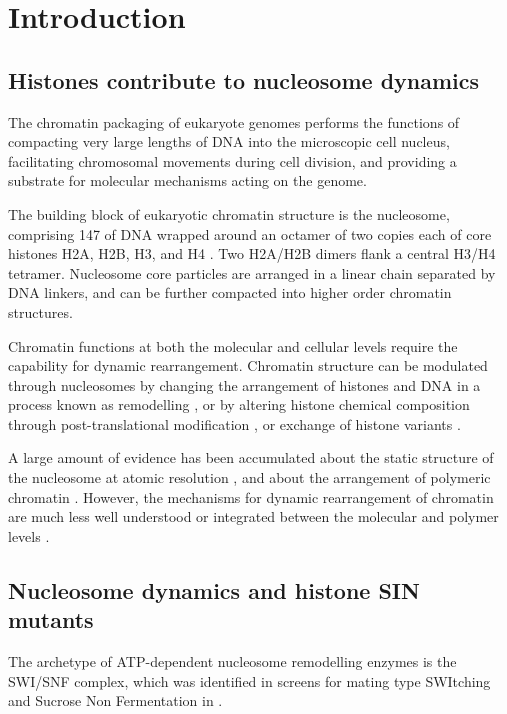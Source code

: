 \section{Introduction}

  \subsection{Histones contribute to nucleosome dynamics}

    The chromatin packaging of eukaryote genomes performs the
    functions of compacting very large lengths of DNA into the
    microscopic cell nucleus, facilitating chromosomal movements
    during cell division, and providing a substrate for molecular
    mechanisms acting on the genome.

    The building block of eukaryotic chromatin structure is the
    nucleosome, comprising \SI{147}{\bp} of DNA wrapped around an
    octamer of two copies each of core histones
    H2A, H2B, H3, and H4 \citep{luger1997crystal}.
    Two H2A/H2B dimers flank a central H3/H4 tetramer.
    Nucleosome core particles are arranged
    in a linear chain separated by DNA linkers, and can be further
    compacted into higher order chromatin structures.

    Chromatin functions at both the molecular and cellular levels
    require the capability for dynamic rearrangement.  Chromatin
    structure can be modulated through nucleosomes by changing the
    arrangement of histones and DNA in a process known as remodelling
    \citep{flaus2011mechanisms}, or by altering histone chemical
    composition through post-translational modification
    \citep{bannister2011ptm-review}, or exchange of histone variants
    \citep{TalbertHenikoff2010}.

    A large amount of evidence has been accumulated about the static
    structure of the nucleosome at atomic resolution
    \citep{mcginty2014histone}, and about the arrangement of polymeric
    chromatin \citep{kuznetsova2016chromatin}.  However, the
    mechanisms for dynamic rearrangement of chromatin are much less
    well understood or integrated between the molecular and polymer
    levels \citep{andrews2011nucleosome}.

  \subsection{Nucleosome dynamics and histone SIN mutants}

    The archetype of ATP-dependent nucleosome remodelling enzymes is
    the SWI/SNF complex, which was identified in screens for mating
    type SWItching \citep{SWI-mutants} and Sucrose Non Fermentation
    \citep{SNF-mutants-original-discovery, SNF-mutants2} in
    .

